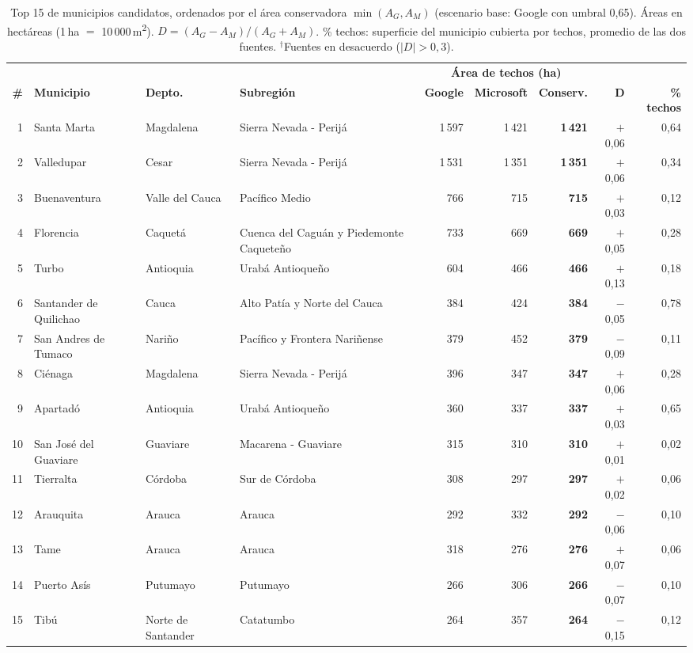 \begin{table}[H]
\centering\scriptsize
\caption{Top 15 de municipios candidatos, ordenados por el área conservadora $\min(A_G, A_M)$ (escenario base: Google con umbral 0,65). Áreas en hectáreas (1\,ha $=$ 10\,000\,m\textsuperscript{2}). $D = (A_G - A_M)/(A_G + A_M)$. \% techos: superficie del municipio cubierta por techos, promedio de las dos fuentes. $^{\dagger}$Fuentes en desacuerdo ($|D| > 0,3$).}
\label{tab:ranking}
\setlength{\tabcolsep}{3.5pt}
\begin{tabularx}{\textwidth}{@{}r>{\raggedright\arraybackslash}p{2.6cm}>{\raggedright\arraybackslash}p{1.7cm}>{\raggedright\arraybackslash}Xrrrrr@{}}
\toprule
 & & & & \multicolumn{3}{c}{\textbf{Área de techos (ha)}} & & \\
\cmidrule(lr){5-7}
\textbf{\#} & \textbf{Municipio} & \textbf{Depto.} & \textbf{Subregión} & \textbf{Google} & \textbf{Microsoft} & \textbf{Conserv.} & $\boldsymbol{D}$ & \textbf{\% techos} \\
\midrule
1 & Santa Marta & Magdalena & Sierra Nevada - Perijá & 1\,597 & 1\,421 & \textbf{1\,421} & $+$0,06 & 0,64 \\
2 & Valledupar & Cesar & Sierra Nevada - Perijá & 1\,531 & 1\,351 & \textbf{1\,351} & $+$0,06 & 0,34 \\
3 & Buenaventura & Valle del Cauca & Pacífico Medio & 766 & 715 & \textbf{715} & $+$0,03 & 0,12 \\
4 & Florencia & Caquetá & Cuenca del Caguán y Piedemonte Caqueteño & 733 & 669 & \textbf{669} & $+$0,05 & 0,28 \\
5 & Turbo & Antioquia & Urabá Antioqueño & 604 & 466 & \textbf{466} & $+$0,13 & 0,18 \\
6 & Santander de Quilichao & Cauca & Alto Patía y Norte del Cauca & 384 & 424 & \textbf{384} & $-$0,05 & 0,78 \\
7 & San Andres de Tumaco & Nariño & Pacífico y Frontera Nariñense & 379 & 452 & \textbf{379} & $-$0,09 & 0,11 \\
8 & Ciénaga & Magdalena & Sierra Nevada - Perijá & 396 & 347 & \textbf{347} & $+$0,06 & 0,28 \\
9 & Apartadó & Antioquia & Urabá Antioqueño & 360 & 337 & \textbf{337} & $+$0,03 & 0,65 \\
10 & San José del Guaviare & Guaviare & Macarena - Guaviare & 315 & 310 & \textbf{310} & $+$0,01 & 0,02 \\
11 & Tierralta & Córdoba & Sur de Córdoba & 308 & 297 & \textbf{297} & $+$0,02 & 0,06 \\
12 & Arauquita & Arauca & Arauca & 292 & 332 & \textbf{292} & $-$0,06 & 0,10 \\
13 & Tame & Arauca & Arauca & 318 & 276 & \textbf{276} & $+$0,07 & 0,06 \\
14 & Puerto Asís & Putumayo & Putumayo & 266 & 306 & \textbf{266} & $-$0,07 & 0,10 \\
15 & Tibú & Norte de Santander & Catatumbo & 264 & 357 & \textbf{264} & $-$0,15 & 0,12 \\
\bottomrule
\end{tabularx}
\end{table}
